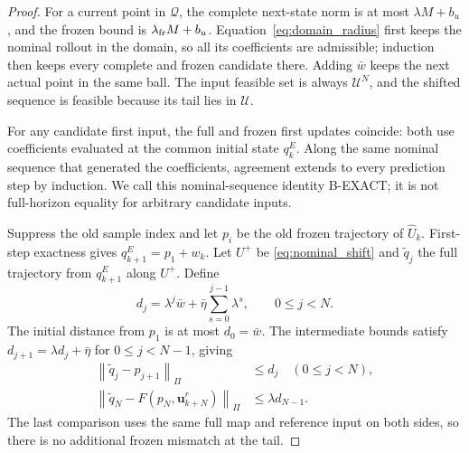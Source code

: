 \documentclass[journal]{IEEEtran}
\newcommand{\vu}{\mathbf{u}}
\newcommand{\norm}[1]{\left\lVert #1\right\rVert}
\begin{document}
\begin{proof}
For a current point in $\mathcal Q$, the complete next-state norm is at most $\lambda M+b_u$, and the frozen bound is $\lambda_{\rm fr}M+b_u$. Equation~\eqref{eq:domain_radius} first keeps the nominal rollout in the domain, so all its coefficients are admissible; induction then keeps every complete and frozen candidate there. Adding $\bar w$ keeps the next actual point in the same ball. The input feasible set is always $\mathcal U^N$, and the shifted sequence is feasible because its tail lies in $\mathcal U$.

For any candidate first input, the full and frozen first updates coincide: both use coefficients evaluated at the common initial state $q_k^E$. Along the same nominal sequence that generated the coefficients, agreement extends to every prediction step by induction. We call this nominal-sequence identity B-EXACT; it is not full-horizon equality for arbitrary candidate inputs.

Suppress the old sample index and let $p_i$ be the old frozen trajectory of $\widehat U_k$. First-step exactness gives $q_{k+1}^E=p_1+w_k$. Let $U^+$ be \eqref{eq:nominal_shift} and $\widetilde q_j$ the full trajectory from $q_{k+1}^E$ along $U^+$. Define
\begin{equation}
d_j=\lambda^j\bar w+\bar\eta\sum_{s=0}^{j-1}\lambda^s,\qquad 0\le j<N.
\label{eq:shift_error}
\end{equation}
The initial distance from $p_1$ is at most $d_0=\bar w$. The intermediate bounds satisfy $d_{j+1}=\lambda d_j+\bar\eta$ for $0\le j<N-1$, giving
\begin{equation}
\begin{split}
\norm{\widetilde q_j-p_{j+1}}_\Pi&\le d_j\quad(0\le j<N),\\
\norm{\widetilde q_N-F(p_N,\vu_{k+N}^r)}_\Pi
&\le\lambda d_{N-1}.
\end{split}
\label{eq:shift_comparison}
\end{equation}
The last comparison uses the same full map and reference input on both sides, so there is no additional frozen mismatch at the tail.


\end{proof}
\end{document}

